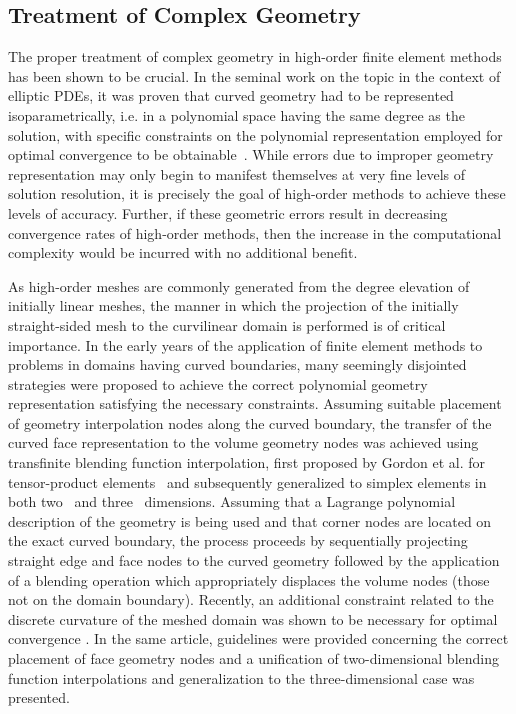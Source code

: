 \subsection{Treatment of Complex Geometry}
\label{sec:background_complex_geom}

The proper treatment of complex geometry in high-order finite element methods has been
shown to be crucial. In the seminal work on the topic in the context of elliptic
PDEs, it was proven that curved geometry had to be represented
isoparametrically, i.e. in a polynomial space having the same degree as the
solution, with specific constraints on the polynomial representation employed
for optimal convergence to be obtainable~\cite[Theorem
]{Ciarlet1972}.
While errors due to improper geometry representation may only begin to manifest
themselves at very fine levels of solution resolution, it is precisely the goal
of high-order methods to achieve these levels of accuracy. Further, if these
geometric errors result in decreasing convergence rates of high-order methods,
then the increase in the computational complexity would be incurred with no
additional benefit.

As high-order meshes are commonly generated from the degree elevation of
initially linear meshes, the manner in which the projection of the initially
straight-sided mesh to the curvilinear domain is performed is of critical importance.
In the early years of the application of finite element methods to problems
in domains having curved boundaries, many seemingly disjointed strategies
were proposed to achieve the correct polynomial geometry representation satisfying the
necessary constraints. Assuming suitable placement of geometry interpolation
nodes along the curved boundary, the transfer of the curved face representation
to the volume geometry nodes was achieved using transfinite blending function
interpolation, first proposed by Gordon et al. for tensor-product
elements~\cite{Gordon1973} and subsequently generalized to simplex
elements in both
two~\cite{Nielson1979,Haber1981,Szabo1991,Lacombe1988,Dey1997,Xie2013} and
three~\cite{Lenoir1986} dimensions.
Assuming that a Lagrange polynomial description of the geometry is being used
and that corner nodes are located on the exact curved boundary, the process
proceeds by sequentially projecting straight edge and face nodes to the curved
geometry followed by the application of a blending operation which appropriately
displaces the volume nodes (those not on the domain boundary). Recently, an additional
constraint related to the discrete curvature of the meshed domain was shown to
be necessary for optimal convergence . In the same article, guidelines were provided concerning the
correct placement of face geometry nodes and a unification of two-dimensional
blending function interpolations and generalization to the three-dimensional
case was presented.

